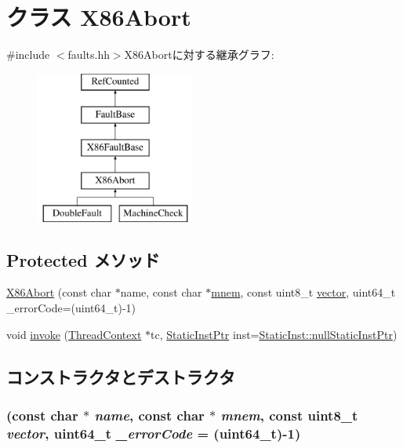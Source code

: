 \hypertarget{classX86ISA_1_1X86Abort}{
\section{クラス X86Abort}
\label{classX86ISA_1_1X86Abort}
}


{\ttfamily \#include $<$faults.hh$>$}X86Abortに対する継承グラフ:\begin{figure}[H]
\begin{center}
\leavevmode
\includegraphics[height=5cm]{classX86ISA_1_1X86Abort}
\end{center}
\end{figure}
\subsection*{Protected メソッド}
\begin{DoxyCompactItemize}
\item 
\hyperlink{classX86ISA_1_1X86Abort_a8bdd374dfd9af6077a2be82dd4200267}{X86Abort} (const char $\ast$name, const char $\ast$\hyperlink{classX86ISA_1_1X86FaultBase_a7bb17f43dadf35d103ef6a25b64c4e9f}{mnem}, const uint8\_\-t \hyperlink{classX86ISA_1_1X86FaultBase_ae369101f45bd256ca2745204afe38a47}{vector}, uint64\_\-t \_\-errorCode=(uint64\_\-t)-\/1)
\item 
void \hyperlink{classX86ISA_1_1X86Abort_a2bd783b42262278d41157d428e1f8d6f}{invoke} (\hyperlink{classThreadContext}{ThreadContext} $\ast$tc, \hyperlink{classRefCountingPtr}{StaticInstPtr} inst=\hyperlink{classStaticInst_aa793d9793af735f09096369fb17567b6}{StaticInst::nullStaticInstPtr})
\end{DoxyCompactItemize}


\subsection{コンストラクタとデストラクタ}
\hypertarget{classX86ISA_1_1X86Abort_a8bdd374dfd9af6077a2be82dd4200267}{
\subsubsection[{X86Abort}]{ (const char $\ast$ {\em name}, \/  const char $\ast$ {\em mnem}, \/  const uint8\_\-t {\em vector}, \/  uint64\_\-t {\em \_\-errorCode} = {\ttfamily (uint64\_\-t)-\/1})}}
\label{classX86ISA_1_1X86Abort_a8bdd374dfd9af6077a2be82dd4200267}



